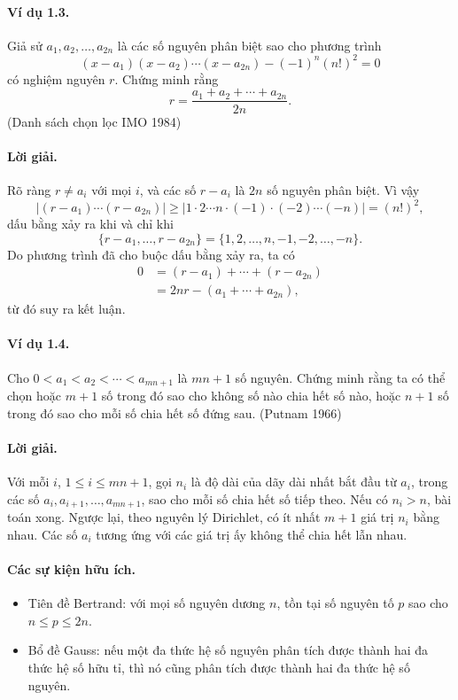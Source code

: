\documentclass[11pt]{article}
\begin{document}
\paragraph{Ví dụ 1.3.}
Giả sử \(a_1,a_2,\ldots,a_{2n}\) là các số nguyên phân biệt sao cho phương
trình
\[
  (x-a_1)(x-a_2)\cdots(x-a_{2n})-(-1)^n(n!)^2=0
\]
có nghiệm nguyên \(r\). Chứng minh rằng
\[
  r=\frac{a_1+a_2+\cdots+a_{2n}}{2n}.
\]
(Danh sách chọn lọc IMO 1984)

\paragraph{Lời giải.}
Rõ ràng \(r\ne a_i\) với mọi \(i\), và các số \(r-a_i\) là \(2n\) số nguyên
phân biệt. Vì vậy
\[
 |(r-a_1)\cdots(r-a_{2n})|
 \ge |1\cdot2\cdots n\cdot(-1)\cdot(-2)\cdots(-n)|=(n!)^2,
\]
dấu bằng xảy ra khi và chỉ khi
\[
 \{r-a_1,\ldots,r-a_{2n}\}=\{1,2,\ldots,n,-1,-2,\ldots,-n\}.
\]
Do phương trình đã cho buộc dấu bằng xảy ra, ta có
\[
\begin{aligned}
 0&=(r-a_1)+\cdots+(r-a_{2n})\\
  &=2nr-(a_1+\cdots+a_{2n}),
\end{aligned}
\]
từ đó suy ra kết luận.

\paragraph{Ví dụ 1.4.}
Cho \(0<a_1<a_2<\cdots<a_{mn+1}\) là \(mn+1\) số nguyên. Chứng minh rằng ta có
thể chọn hoặc \(m+1\) số trong đó sao cho không số nào chia hết số nào, hoặc
\(n+1\) số trong đó sao cho mỗi số chia hết số đứng sau.
(Putnam 1966)

\paragraph{Lời giải.}
Với mỗi \(i\), \(1\le i\le mn+1\), gọi \(n_i\) là độ dài của dãy dài nhất bắt
đầu từ \(a_i\), trong các số \(a_i,a_{i+1},\ldots,a_{mn+1}\), sao cho mỗi số
chia hết số tiếp theo. Nếu có \(n_i>n\), bài toán xong. Ngược lại, theo nguyên
lý Dirichlet, có ít nhất \(m+1\) giá trị \(n_i\) bằng nhau. Các số \(a_i\)
tương ứng với các giá trị ấy không thể chia hết lẫn nhau.

\paragraph{Các sự kiện hữu ích.}
\begin{itemize}
\item Tiên đề Bertrand: với mọi số nguyên dương \(n\), tồn tại số nguyên tố
\(p\) sao cho \(n\le p\le2n\).
\item Bổ đề Gauss: nếu một đa thức hệ số nguyên phân tích được thành hai đa
thức hệ số hữu tỉ, thì nó cũng phân tích được thành hai đa thức hệ số nguyên.
\end{itemize}
\end{document}
